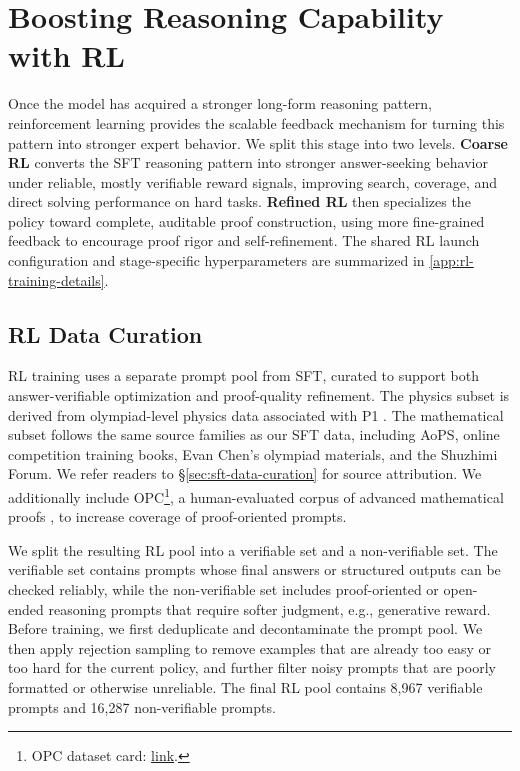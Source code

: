 \section{Boosting Reasoning Capability with RL}
\label{sec:rl}

Once the model has acquired a stronger long-form reasoning pattern,
reinforcement learning provides the scalable feedback mechanism for turning this
pattern into stronger expert behavior. We split this stage into two levels.
\textbf{Coarse RL} converts the SFT reasoning pattern into stronger
answer-seeking behavior under reliable, mostly verifiable reward signals,
improving search, coverage, and direct solving performance on hard tasks.
\textbf{Refined RL} then specializes the policy toward complete, auditable proof
construction, using more fine-grained feedback to encourage proof rigor and
self-refinement.
The shared
RL launch configuration and stage-specific hyperparameters are summarized in
\cref{app:rl-training-details}.

\subsection{RL Data Curation}

RL training uses a separate prompt pool from SFT, curated to support both
answer-verifiable optimization and proof-quality refinement. The physics subset
is derived from olympiad-level physics data associated with P1
\citep{chen2025p1}. The mathematical subset follows the same source families as
our SFT data, including AoPS, online competition training books, Evan Chen's
olympiad materials, and the Shuzhimi Forum. We refer readers to
\S\ref{sec:sft-data-curation} for source attribution. We additionally include
OPC\footnote{OPC dataset card:
\href{https://huggingface.co/datasets/INSAIT-Institute/OPC}{link}.}, a
human-evaluated corpus of advanced mathematical proofs \citep{dekoninck2025opc},
to increase coverage of proof-oriented prompts.

We split the resulting RL pool into a verifiable set and a non-verifiable set.
The verifiable set contains prompts whose final answers or structured outputs
can be checked reliably, while the non-verifiable set includes proof-oriented
or open-ended reasoning prompts that require softer judgment, e.g., generative reward. 
Before training,
we first deduplicate and decontaminate the prompt pool. We then apply rejection
sampling to remove examples that are already too easy or too hard for the
current policy, and further filter noisy prompts that are poorly formatted or otherwise unreliable. The final RL pool
contains 8,967 verifiable prompts and 16,287 non-verifiable prompts.



